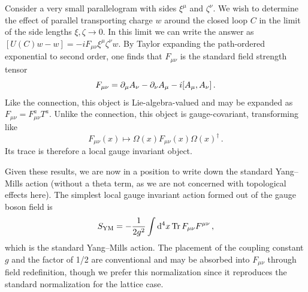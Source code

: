 \documentclass[reprint,superscriptaddress,pra,nofootinbib,preprintnumbers,floatfix]{revtex4-1}
\begin{document}
Consider a very small parallelogram with sides $\xi^\mu$ and $\zeta^\nu$. 
%
We wish to determine the effect of parallel transporting charge $w$ around the closed loop $C$ in the limit of the side lengths $\xi, \zeta \to 0$. 
%
In this limit we can write the answer as $[U(C)w-w] = -i F_{\mu\nu} \xi^\mu \zeta^\nu w$. 
%
By Taylor expanding the path-ordered exponential to second order, one finds that $F_{\mu\nu}$ is the standard field strength tensor
%
\begin{equation}\label{eq:F_def}
    F_{\mu\nu} = \partial_\mu A_\nu - \partial_\nu A_\mu - i \comm{A_\mu}{A_\nu} \,.
\end{equation}
%
Like the connection, this object is Lie-algebra-valued and may be expanded as $F_{\mu\nu} = F_{\mu\nu}^a T^a$. 
%
Unlike the connection, this object is gauge-covariant, transforming like
%
\begin{equation}
F_{\mu\nu}(x) \longmapsto \Omega(x) F_{\mu\nu}(x) \Omega(x)^\dagger \,.
\end{equation}
%
Its trace is therefore a local gauge invariant object. 



Given these results, we are now in a position to write down the standard Yang--Mills action (without a theta term, as we are not concerned with topological effects here). 
%
The simplest local gauge invariant action formed out of the gauge boson field is
%
\begin{equation}\label{eq:YM_action}
    S_\mathrm{YM} = -\frac{1}{2g^2} \int \dd[4]{x} \Tr F_{\mu\nu} F^{\mu\nu} \,,
\end{equation}
%
which is the standard Yang--Mills action. 
%
The placement of the coupling constant $g$ and the factor of 1/2 are conventional and may be absorbed into $F_{\mu\nu}$ through field redefinition, though we prefer this normalization since it reproduces the standard normalization for the lattice case.
\end{document}
